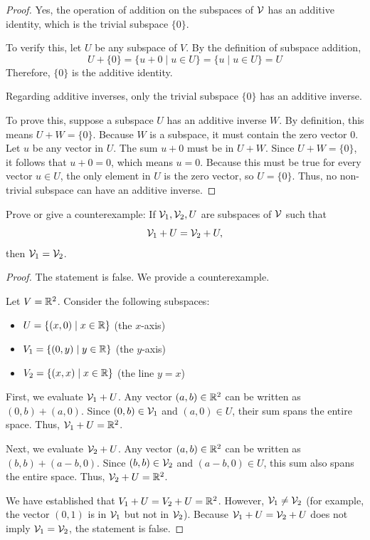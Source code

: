 \begin{proof}
	Yes, the operation of addition on the subspaces of $\mathcal{V}$ has an additive identity, which is the trivial subspace $\{0\}$.
	
	To verify this, let $U$ be any subspace of $V$. By the definition of subspace addition, 
	\[ U + \{0\} = \{u + 0 \mid u \in U\} = \{u \mid u \in U\} = U \]
	Therefore, $\{0\}$ is the additive identity.
	
	Regarding additive inverses, only the trivial subspace $\{0\}$ has an additive inverse. 
	
	To prove this, suppose a subspace $U$ has an additive inverse $W$. By definition, this means $U + W = \{0\}$. 
	Because $W$ is a subspace, it must contain the zero vector $0$. 
	Let $u$ be any vector in $U$. The sum $u + 0$ must be in $U + W$. 
	Since $U + W = \{0\}$, it follows that $u + 0 = 0$, which means $u = 0$. 
	Because this must be true for every vector $u \in U$, the only element in $U$ is the zero vector, so $U = \{0\}$. 
	Thus, no non-trivial subspace can have an additive inverse.
\end{proof}
\begin{question}
	Prove or give a counterexample: If $\mathcal{V}_1, \mathcal{V}_2, U$ are subspaces of $\mathcal{V}$ such that
	\[ \mathcal{V}_1 + U = \mathcal{V}_2 + U, \]
	then $\mathcal{V}_1 = \mathcal{V}_2$.
\end{question}
\begin{proof}
	The statement is false. We provide a counterexample.
	
	Let $V = \mathbb{R}^2$. Consider the following subspaces:
	\begin{itemize}
		\item $U = \{(x, 0) \mid x \in \mathbb{R}\}$ (the $x$-axis)
		\item $V_1 = \{(0, y) \mid y \in \mathbb{R}\}$ (the $y$-axis)
		\item $V_2 = \{(x, x) \mid x \in \mathbb{R}\}$ (the line $y=x$)
	\end{itemize}
	
	First, we evaluate $\mathcal{V}_1 + U$. Any vector $(a, b) \in \mathbb{R}^2$ can be written as $(0, b) + (a, 0)$. Since $(0, b) \in \mathcal{V}_1$ and $(a, 0) \in U$, their sum spans the entire space. Thus, $\mathcal{V}_1 + U = \mathbb{R}^2$.
	
	Next, we evaluate $\mathcal{V}_2 + U$. Any vector $(a, b) \in \mathbb{R}^2$ can be written as $(b, b) + (a-b, 0)$. Since $(b, b) \in \mathcal{V}_2$ and $(a-b, 0) \in U$, this sum also spans the entire space. Thus, $\mathcal{V}_2 + U = \mathbb{R}^2$.
	
	We have established that $V_1 + U = V_2 + U = \mathbb{R}^2$. 
	However, $\mathcal{V}_1 \neq \mathcal{V}_2$ (for example, the vector $(0, 1)$ is in $\mathcal{V}_1$ but not in $\mathcal{V}_2$). 
	Because $\mathcal{V}_1 + U = \mathcal{V}_2 + U$ does not imply $\mathcal{V}_1 = \mathcal{V}_2$, the statement is false.
\end{proof}

